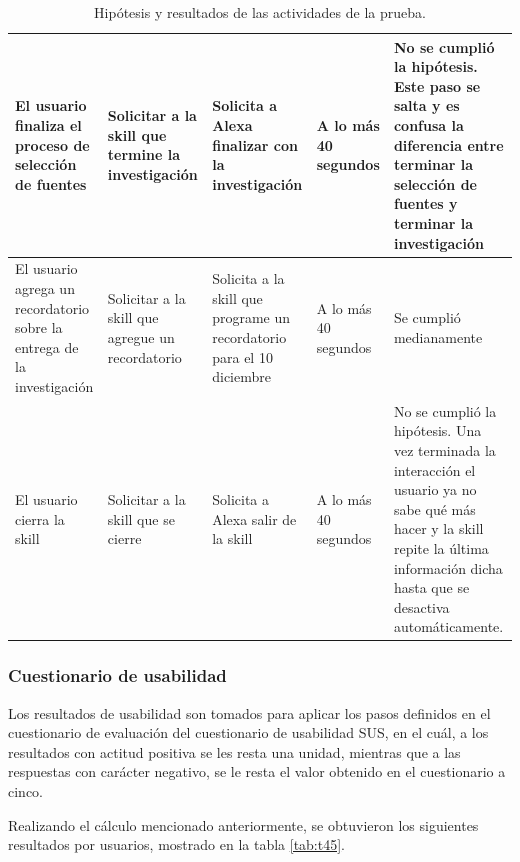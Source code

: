 \begin{table}
  \begin{center}
    \begin{tabular}{ | p{3cm} | p{3cm} | p{3cm} | p{2cm} | p{4cm} | }
      \hline
      El usuario finaliza el proceso de selección de fuentes & Solicitar a la skill que termine la investigación & Solicita a Alexa finalizar con la investigación & A lo más 40 segundos & No se cumplió la hipótesis. Este paso se salta y es confusa la diferencia entre terminar la selección de fuentes y terminar la investigación \\ \hline
      El usuario agrega un recordatorio sobre la entrega de la investigación & Solicitar a la skill que agregue un recordatorio & Solicita a la skill que programe un recordatorio para el 10 diciembre & A lo más 40 segundos & Se cumplió medianamente \\ \hline
      El usuario cierra la skill & Solicitar a la skill que se cierre & Solicita a Alexa salir de la skill & A lo más 40 segundos & No se cumplió la hipótesis. Una vez terminada la interacción el usuario ya no sabe qué más hacer y la skill repite la última información dicha hasta que se desactiva automáticamente. \\ \hline
    \end{tabular}
    \caption{Hipótesis y resultados de las actividades de la prueba.}
    \label{tab:t44}
  \end{center}
\end{table}


\subsubsection{Cuestionario de usabilidad}
\label{CuestionarioUsabilidadcapIV}

Los resultados de usabilidad son tomados para aplicar los pasos definidos en el cuestionario de evaluación del cuestionario de usabilidad SUS, en el cuál, a los resultados con actitud positiva se les resta una unidad, mientras que a las respuestas con carácter negativo, se le resta el valor obtenido en el cuestionario a cinco.

Realizando el cálculo mencionado anteriormente, se obtuvieron los siguientes resultados por usuarios, mostrado en la tabla \ref{tab:t45}.

